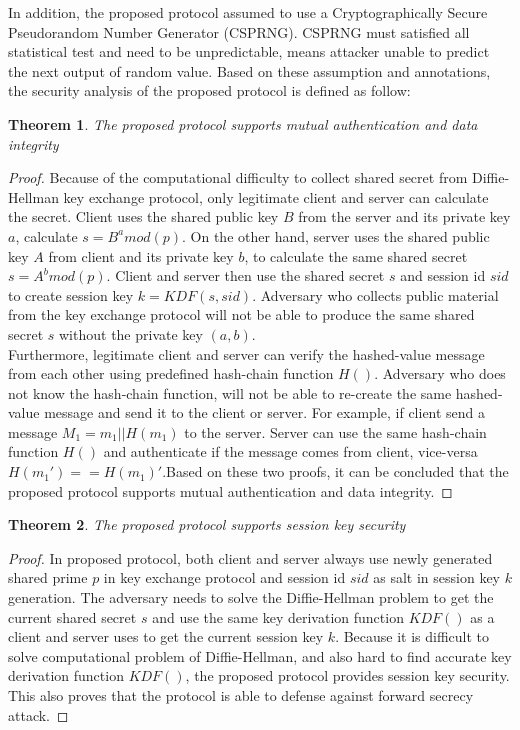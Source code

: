 In addition, the proposed protocol assumed to use a Cryptographically Secure Pseudorandom Number Generator (CSPRNG). CSPRNG must satisfied all statistical test and need to be unpredictable, means attacker unable to predict the next output of random value. Based on these assumption and annotations, the security analysis of the proposed protocol is defined as follow:
\renewcommand{\qedsymbol}{}
\newtheorem{theorem}{Theorem}
\begin{theorem}
	\label{theo:mutualAuth}
	The proposed protocol supports mutual authentication and data integrity
\end{theorem}
\begin{proof}
	Because of the computational difficulty to collect shared secret from Diffie-Hellman key exchange protocol, only legitimate client and server can calculate the secret. Client uses the shared public key $B$ from the server and its private key $a$, calculate $s = B^amod(p)$. On the other hand, server uses the shared public key $A$ from client and its private key $b$, to calculate the same shared secret $s = A^bmod(p)$. Client and server then use the shared secret $s$ and session id $sid$ to create session key $k=KDF(s,sid)$. Adversary who collects public material from the key exchange protocol will not be able to produce the same shared secret $s$ without the private key $(a,b)$.\\
	\indent Furthermore, legitimate client and server can verify the hashed-value message from each other using predefined hash-chain function $H()$. Adversary who does not know the hash-chain function, will not be able to re-create the same hashed-value message and send it to the client or server. For example, if client send a message $M_1 = m_1||H(m_1)$ to the server. Server can use the same hash-chain function $H()$ and authenticate if the message comes from client, vice-versa $H(m_1')==H(m_1)'$.Based on these two proofs, it can be concluded that the proposed protocol supports mutual authentication and data integrity.
\end{proof}

\begin{theorem}
	The proposed protocol supports session key security
\end{theorem}
\begin{proof}
	In proposed protocol, both client and server always use newly generated shared prime $p$ in key exchange protocol and session id $sid$ as salt in session key $k$ generation. The adversary needs to solve the Diffie-Hellman problem to get the current shared secret $s$ and use the same key derivation function $KDF()$ as a client and server uses to get the current session key $k$. Because it is difficult to solve computational problem of Diffie-Hellman, and also hard to find accurate key derivation function $KDF()$, the proposed protocol provides session key security. This also proves that the protocol is able to defense against forward secrecy attack.
\end{proof}

